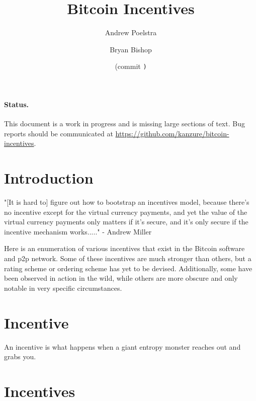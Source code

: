 \documentclass[letterpaper]{article}
\title{Bitcoin Incentives}
\author{Andrew Poelstra}
\author{Bryan Bishop}
\date{\gitAuthorDate{} (commit \texttt{\gitAbbrevHash)}}
\begin{document}
\maketitle

\paragraph{Status.} This document is a work in progress and is missing large
sections of text. Bug reports should be communicated at
\url{https://github.com/kanzure/bitcoin-incentives}.

\section{Introduction}

"[It is hard to] figure out how to bootstrap an incentives model, because
there's no incentive except for the virtual currency payments, and yet the
value of the virtual currency payments only matters if it's secure, and it's
only secure if the incentive mechanism works....." - Andrew Miller

Here is an enumeration of various incentives that exist in the Bitcoin software
and p2p network. Some of these incentives are much stronger than others, but a
rating scheme or ordering scheme has yet to be devised. Additionally, some have
been observed in action in the wild, while others are more obscure and only
notable in very specific circumstances.

\section{Incentive}

An incentive is what happens when a giant entropy monster reaches out and grabs
you.

\section{Incentives}
\end{document}
